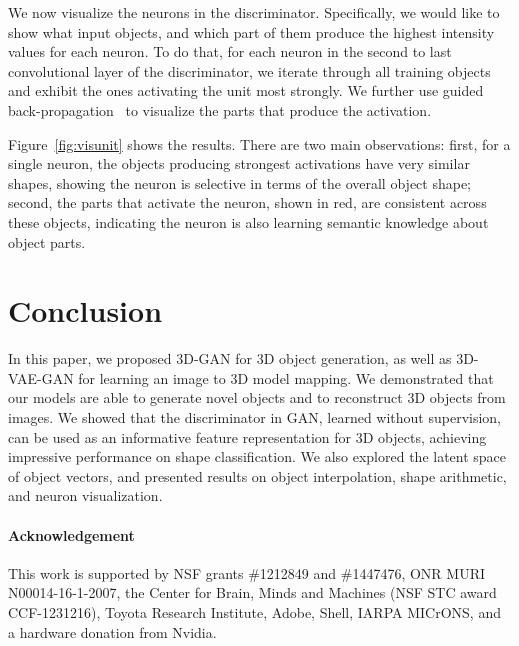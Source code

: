 \documentclass{article}
\newcommand{\fig}[1]{Figure~\ref{#1}}
\newcommand{\model}{3D-GAN\xspace}
\newcommand{\vaemodel}{3D-VAE-GAN\xspace}
\newcommand{\presection}{\vspace{-8pt}}
\newcommand{\postsection}{\vspace{-8pt}}
\begin{document}
We now visualize the neurons in the discriminator. Specifically, we would like to show what input objects, 
and which part of them produce the highest intensity values for each neuron. To do that, for each neuron in the second to last convolutional layer of the discriminator, we iterate through all training objects and exhibit the ones activating the unit most strongly. We further use guided back-propagation~\citep{springenberg2014striving} to visualize the parts that produce the activation. 

\fig{fig:visunit} shows the results. There are two main observations: first, for a single neuron, the objects producing strongest activations have very similar shapes, showing the neuron is selective in terms of the overall object shape; second, the parts that activate the neuron, shown in red, are consistent across these objects, indicating the neuron is also learning semantic knowledge about object parts.


\presection
\section{Conclusion}
\postsection

In this paper, we proposed \model for 3D object generation, as well as \vaemodel for learning an image to 3D model mapping. We demonstrated that our models are able to generate novel objects and to reconstruct 3D objects from images. We showed that the discriminator in GAN, learned without supervision, can be used as an informative feature representation for 3D objects, achieving impressive performance on shape classification. We also explored the latent space of object vectors, and presented results on object interpolation, shape arithmetic, and neuron visualization.

\presection
\paragraph{Acknowledgement} This work is supported by NSF grants \#1212849 and \#1447476, ONR MURI N00014-16-1-2007, the Center for Brain, Minds and Machines (NSF STC award CCF-1231216), Toyota Research Institute, Adobe, Shell, IARPA MICrONS, and a hardware donation from Nvidia. 
\postsection

{\small
\setlength{\bibsep}{0pt}


}

\newpage
\appendix
\renewcommand{\thesection}{A.\arabic{section}}
\renewcommand{\thefigure}{A\arabic{figure}}
\setcounter{section}{0}
\setcounter{figure}{0}
\end{document}

